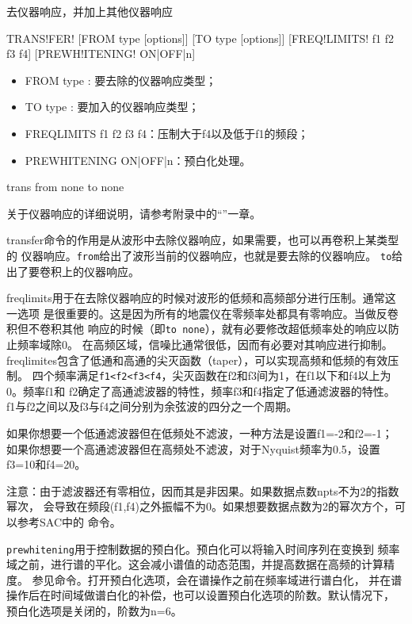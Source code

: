 \label{cmd:transfer}

去仪器响应，并加上其他仪器响应

\begin{SACSTX}
TRANS!FER! [FROM type [options]] [TO type [options]]
    [FREQ!LIMITS! f1 f2 f3 f4] [PREWH!ITENING! ON|OFF|n]
\end{SACSTX}

\begin{itemize}
\item FROM type : 要去除的仪器响应类型；
\item TO type : 要加入的仪器响应类型；
\item FREQLIMITS f1 f2 f3 f4：压制大于f4以及低于f1的频段；
\item PREWHITENING ON|OFF|n：预白化处理。
\end{itemize}

\begin{SACDFT}
trans from none to none
\end{SACDFT}

关于仪器响应的详细说明，请参考附录中的``''一章。

transfer命令的作用是从波形中去除仪器响应，如果需要，也可以再卷积上某类型的
仪器响应。\verb+from+给出了波形当前的仪器响应，也就是要去除的仪器响应。
\verb+to+给出了要卷积上的仪器响应。

freqlimits用于在去除仪器响应的时候对波形的低频和高频部分进行压制。通常这一选项
是很重要的。这是因为所有的地震仪在零频率处都具有零响应。当做反卷积但不卷积其他
响应的时候（即\verb+to none+），就有必要修改超低频率处的响应以防止频率域除0。
在高频区域，信噪比通常很低，因而有必要对其响应进行抑制。
freqlimites包含了低通和高通的尖灭函数（taper），可以实现高频和低频的有效压制。
四个频率满足\verb+f1<f2<f3<f4+，尖灭函数在f2和f3间为1，在f1以下和f4以上为0。频率f1和
f2确定了高通滤波器的特性，频率f3和f4指定了低通滤波器的特性。
f1与f2之间以及f3与f4之间分别为余弦波的四分之一个周期。

如果你想要一个低通滤波器但在低频处不滤波，一种方法是设置f1=-2和f2=-1；
如果你想要一个高通滤波器但在高频处不滤波，对于Nyquist频率为0.5，设置f3=10和f4=20。

注意：由于滤波器还有零相位，因而其是非因果。如果数据点数npts不为2的指数幂次，
会导致在频段(f1,f4)之外振幅不为0。如果想要数据点数为2的幂次方个，可以参考SAC中的
命令。

\verb+prewhitening+用于控制数据的预白化。预白化可以将输入时间序列在变换到
频率域之前，进行谱的平化。这会减小谱值的动态范围，并提高数据在高频的计算精度。
参见命令。打开预白化选项，会在谱操作之前在频率域进行谱白化，
并在谱操作后在时间域做谱白化的补偿，也可以设置预白化选项的阶数。默认情况下，
预白化选项是关闭的，阶数为n=6。

